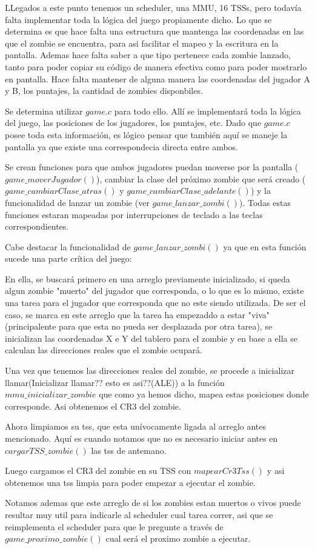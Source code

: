 \documentclass[a4paper]{article}
\begin{document}
LLegados a este punto tenemos un scheduler, una MMU, 16 TSSs, pero todavía falta implementar toda la lógica del juego propiamente dicho. Lo que se determina es que hace falta una estructura que mantenga las coordenadas en las que el zombie se encuentra, para asi facilitar el mapeo y la escritura en la pantalla. Ademas hace falta saber a que tipo pertenece cada zombie lanzado, tanto para poder copiar su código de manera efectiva como para poder mostrarlo en pantalla. Hace falta mantener de alguna manera las coordenadas del jugador A y B, los puntajes, la cantidad de zombies disponbiles.

Se determina utilizar $game.c$ para todo ello. Allí se implementará toda la lógica del juego, las posiciones de los jugadores, los puntajes, etc. Dado que $game.c$ posee toda esta información, es lógico pensar que también aquí se maneje la pantalla ya que existe una correspondecia directa entre ambos.

Se crean funciones para que ambos jugadores puedan moverse por la pantalla ($game\_ moverJugador()$), cambiar la clase del próximo zombie que será creado ($game\_ cambiarClase\_ atras()$ y $game\_ cambiarClase\_ adelante()$) y la funcionalidad de lanzar un zombie (ver $game\_ lanzar\_ zombi()$). Todas estas funciones estaran mapeadas por interrupciones de teclado a las teclas correspondientes.

Cabe destacar la funcionalidad de $game\_ lanzar\_ zombi()$ ya que en esta función sucede una parte crítica del juego:

En ella, se buscará primero en una arreglo previamente inicializado, si queda algun zombie "muerto" del jugador que corresponda, o lo que es lo mismo, existe una tarea para el jugador que corresponda que no este siendo utilizada. De ser el caso, se marca en este arreglo que la tarea ha empezaddo a estar "viva" (principalente para que esta no pueda ser desplazada por otra tarea), se inicializan las coordenadas X e Y del tablero para el zombie y en base a ella se calculan las direcciones reales que el zombie ocupará.

Una vez que tenemos las direcciones reales del zombie, se procede a inicializar llamar(Inicializar llamar?? esto es asi??(ALE)) a la función $mmu\_ inicializar\_ zombie$ que como ya hemos dicho, mapea estas posiciones donde corresponde. Asi obtenemos el CR3 del zombie.

Ahora limpiamos su tss, que esta unívocamente ligada al arreglo antes mencionado. Aquí es cuando notamos que no es necesario iniciar antes en $cargarTSS\_ zombie()$ las tss de antemano.

Luego cargamos el CR3 del zombie en su TSS con $mapearCr3Tss()$ y asi obtenemos una tss limpia para poder empezar a ejecutar el zombie.

Notamos ademas que este arreglo de si los zombies estan muertos o vivos puede resultar muy util para indicarle al scheduler cual tarea correr, asi que se reimplementa el scheduler para que le pregunte a través de $game\_ proximo\_ zombie()$ cual será el proximo zombie a ejecutar.
\end{document}
